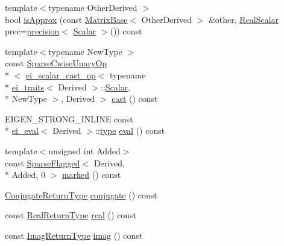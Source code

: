 \begin{DoxyCompactItemize}
\item 
{\footnotesize template$<$typename Other\-Derived $>$ }\\bool \hyperlink{class_sparse_matrix_base_a07cf3b4d642434933dc10874b8e42741}{is\-Approx} (const \hyperlink{class_matrix_base}{Matrix\-Base}$<$ Other\-Derived $>$ \&other, \hyperlink{class_sparse_matrix_base_a615d56082efd03b5f31015cc4900e72f}{Real\-Scalar} prec=\hyperlink{_math_functions_8h_a3dc1c65cf9dc9b5a7ee66472d0ae83e1}{precision}$<$ \hyperlink{class_sparse_matrix_base_af39d70f2b7e775e9e17b666cd24128c8}{Scalar} $>$()) const 
\item 
{\footnotesize template$<$typename New\-Type $>$ }\\const \hyperlink{class_sparse_cwise_unary_op}{Sparse\-Cwise\-Unary\-Op}\\*
$<$ \hyperlink{structei__scalar__cast__op}{ei\-\_\-scalar\-\_\-cast\-\_\-op}$<$ typename \\*
\hyperlink{structei__traits}{ei\-\_\-traits}$<$ Derived $>$\-::\hyperlink{class_sparse_matrix_base_af39d70f2b7e775e9e17b666cd24128c8}{Scalar}, \\*
New\-Type $>$, Derived $>$ \hyperlink{class_sparse_matrix_base_a795c1ecac918c05f4e56d9914e8a9831}{cast} () const 
\item 
E\-I\-G\-E\-N\-\_\-\-S\-T\-R\-O\-N\-G\-\_\-\-I\-N\-L\-I\-N\-E const \\*
\hyperlink{classei__eval}{ei\-\_\-eval}$<$ Derived $>$\-::\hyperlink{glext_8h_a7d05960f4f1c1b11f3177dc963a45d86}{type} \hyperlink{class_sparse_matrix_base_a5d6a829d3e1e61fffec5ea9bfcaf62f3}{eval} () const 
\item 
{\footnotesize template$<$unsigned int Added$>$ }\\const \hyperlink{class_sparse_flagged}{Sparse\-Flagged}$<$ Derived, \\*
Added, 0 $>$ \hyperlink{class_sparse_matrix_base_a9479e9f183ad59c8aee61ac8112e0d6d}{marked} () const 
\item 
\hyperlink{class_sparse_matrix_base_a27b8ae47093df848658ec84ca2ccfb2f}{Conjugate\-Return\-Type} \hyperlink{class_sparse_matrix_base_a2208f45b429ecf066a90deb8943ad8bf}{conjugate} () const 
\item 
const \hyperlink{class_sparse_matrix_base_a4083b1cd2d21766ea0456f57a84d0da9}{Real\-Return\-Type} \hyperlink{class_sparse_matrix_base_a86174e2ca8f220f003120f3c10849069}{real} () const 
\item 
const \hyperlink{class_sparse_matrix_base_a9f0f4399edce5ebf59ebaaa09c599e97}{Imag\-Return\-Type} \hyperlink{class_sparse_matrix_base_a70f6077518c4900038bbec44f1d9a560}{imag} () const 

\end{DoxyCompactItemize}
